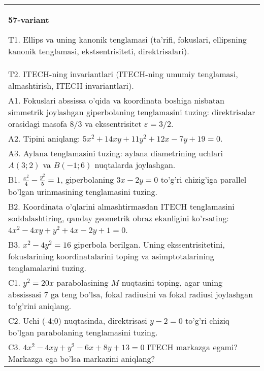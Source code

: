 \documentclass{article}
\begin{document}
\begin{tabular}{m{17cm}}
\textbf{57-variant}
\newline

T1. Ellips va uning kanonik tenglamasi (ta'rifi, fokuslari, ellipsning kanonik tenglamasi, ekstsentrisiteti, direktrisalari).\\

T2. ITECH-ning invariantlari (ITECH-ning umumiy tenglamasi, almashtirish, ITECH invariantlari).\\

A1. Fokuslari abssissa o'qida va koordinata boshiga nisbatan simmetrik joylashgan giperbolaning tenglamasini tuzing: direktrisalar orasidagi masofa $8/3$ va ekssentrisitet $\varepsilon=3/2$.\\

A2. Tipini aniqlang: $5x^{2}+14xy+11y^{2}+12x-7y+19=0$.\\

A3. Aylana tenglamasini tuzing: aylana diametrining uchlari $A(3;2)$ va $B(-1;6)$ nuqtalarda joylashgan.\\

B1. $\frac{x^{2}}{4} - \frac{y^{2}}{5} = 1$, giperbolaning $3x - 2y = 0$ to'g'ri chizig'iga parallel bo'lgan urinmasining tenglamasini tuzing.  \\

B2. Koordinata o'qlarini almashtirmasdan ITECH tenglamasini soddalashtiring, qanday geometrik obraz ekanligini ko'rsating: $4x^{2} - 4xy + y^{2} + 4x - 2y + 1 = 0$.  \\

B3. $x^{2} - 4y^{2} = 16$ giperbola berilgan. Uning ekssentrisitetini, fokuslarining koordinatalarini toping va asimptotalarining tenglamalarini tuzing.\\

C1. $y^{2} = 20x$ parabolasining $M$ nuqtasini toping, agar uning abssissasi 7 ga teng bo'lsa, fokal radiusini va fokal radiusi joylashgan to'g'rini aniqlang.\\

C2. Uchi (-4;0) nuqtasinda, direktrisasi $y - 2 = 0$ to'g'ri chiziq bo'lgan parabolaning tenglamasini tuzing.\\

C3. $4x^{2} - 4xy + y^{2} - 6x + 8y + 13 = 0$ ITECH markazga egami? Markazga ega bo'lsa markazini aniqlang?  \\

\end{tabular}
\vspace{1cm}
\end{document}
